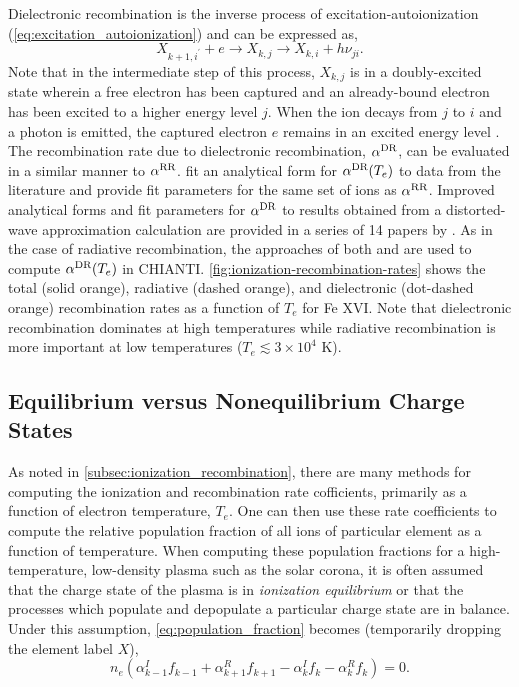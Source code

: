 Dielectronic recombination is the inverse process of excitation-autoionization (\autoref{eq:excitation_autoionization}) and can be expressed as,
\begin{equation}\label{eq:dielectronic_recombination}
    X_{k+1,i^\prime} + e \to X_{k,j} \to X_{k,i} + h\nu_{ji}.
\end{equation}
Note that in the intermediate step of this process, $X_{k,j}$ is in a doubly-excited state wherein a free electron has been captured and an already-bound electron has been excited to a higher energy level $j$. When the ion decays from $j$ to $i$ and a photon is emitted, the captured electron $e$ remains in an excited energy level \citep{bradshaw_collisional_2013}. The recombination rate due to dielectronic recombination, $\alpha^\textup{DR}$, can be evaluated in a similar manner to $\alpha^\textup{RR}$. \citet{shull_ionization_1982} fit an analytical form for $\alpha^\textup{DR}(T_e)$ to data from the literature and provide fit parameters for the same set of ions as $\alpha^\textup{RR}$. Improved analytical forms and fit parameters for $\alpha^\textup{DR}$ to results obtained from a distorted-wave approximation calculation are provided in a series of 14 papers by \citet{badnell_dielectronic_2003}. As in the case of radiative recombination, the approaches of both \citet{shull_ionization_1982} and \citet{badnell_dielectronic_2003} are used to compute $\alpha^\textup{DR}(T_e)$ in CHIANTI. \autoref{fig:ionization-recombination-rates} shows the total (solid orange), radiative (dashed orange), and dielectronic (dot-dashed orange) recombination rates as a function of $T_e$ for Fe XVI. Note that dielectronic recombination dominates at high temperatures while radiative recombination is more important at low temperatures ($T_e\lesssim3\times10^4$ K).

\subsection{Equilibrium versus Nonequilibrium Charge States}\label{subsec:ioneq_versus_nei}

As noted in \autoref{subsec:ionization_recombination}, there are many methods for computing the ionization and recombination rate cofficients, primarily as a function of electron temperature, $T_e$. One can then use these rate coefficients to compute the relative population fraction of all ions of particular element as a function of temperature. When computing these population fractions for a high-temperature, low-density plasma such as the solar corona, it is often assumed that the charge state of the plasma is in \textit{ionization equilibrium} or that the processes which populate and depopulate a particular charge state are in balance. Under this assumption, \autoref{eq:population_fraction} becomes (temporarily dropping the element label $X$),
\begin{equation}\label{eq:ionization_equilibrium}
    n_e(\alpha_{k-1}^I f_{k-1} + \alpha_{k+1}^R f_{k+1} - \alpha_{k}^I f_k - \alpha_k^R f_k) = 0.
\end{equation}


